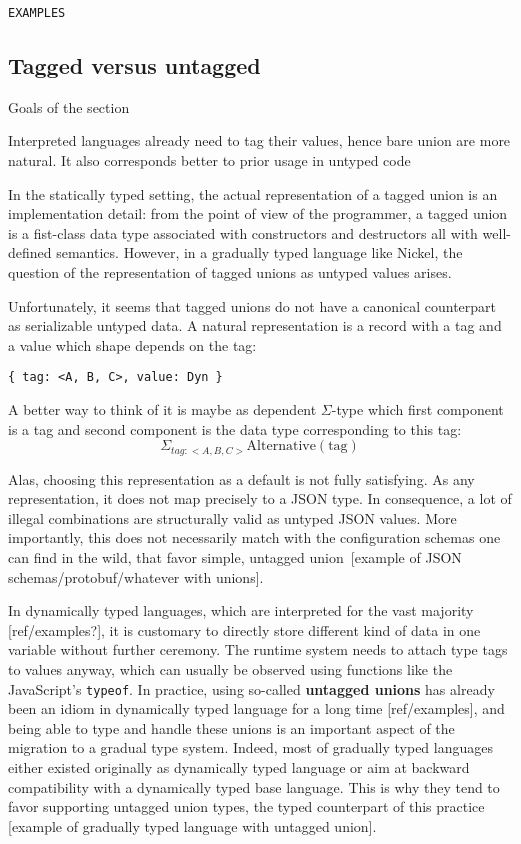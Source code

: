 \documentclass{article}
\begin{document}
\begin{verbatim}
EXAMPLES
\end{verbatim}

\subsection{Tagged versus untagged}
\color{red}Goals of the section

Interpreted languages already need to tag their values, hence bare union are more natural.
It also corresponds better to prior usage in untyped code\vspace{0.5cm}\color{black}

In the statically typed setting, the actual representation of a tagged union is
an implementation detail: from the point of view of the programmer, a tagged
union is a fist-class data type associated with constructors and destructors all
with well-defined semantics.  However, in a gradually typed language like
Nickel, the question of the representation of tagged unions as untyped values
arises.

Unfortunately, it seems that tagged unions do not have a canonical counterpart
as serializable untyped data. A natural representation is a record with a tag
and a value which shape depends on the tag:

\begin{lstlisting}
{ tag: <A, B, C>, value: Dyn }
\end{lstlisting}

A better way to think of it is maybe as dependent $\Sigma$-type which first
component is a tag and second component is the data type corresponding to this
tag:
\[
    \Sigma_{tag : <A, B, C>} \text{Alternative}(\text{tag})
\]

Alas, choosing this representation as a default is not fully satisfying. As any
representation, it does not map precisely to a JSON type. In consequence, a lot
of illegal combinations are structurally valid as untyped JSON values. More
importantly, this does not necessarily match with the configuration schemas one
can find in the wild, that favor simple, untagged union [example of JSON
schemas/protobuf/whatever with unions].

In dynamically typed languages, which are interpreted for the vast majority
[ref/examples?], it is customary to directly store different kind of data in one
variable without further ceremony. The runtime system needs to attach type tags
to values anyway, which can usually be observed using functions like the
JavaScript's \verb+typeof+. In practice, using so-called \textbf{untagged
unions} has already been an idiom in dynamically typed language for a long time
[ref/examples], and being able to type and handle these unions is an important
aspect of the migration to a gradual type system. Indeed, most of gradually
typed languages either existed originally as dynamically typed language or aim
at backward compatibility with a dynamically typed base language. This is why
they tend to favor supporting untagged union types, the typed counterpart of
this practice [example of gradually typed language with untagged union].
\end{document}
